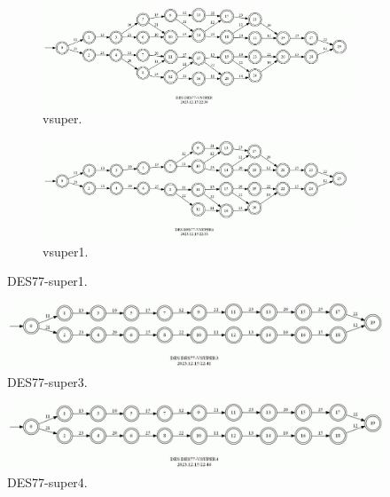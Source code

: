 \documentclass{article}
\begin{document}
\begin{figure}[h!]
  \centering
  \begin{subfigure}{0.8\linewidth}
    \includegraphics[width=\linewidth]{assets/DES77-VSUPER.jpg}
     \caption{vsuper.}
  \end{subfigure}
  \begin{subfigure}{0.8\linewidth}
    \includegraphics[width=\linewidth]{assets/DES77-VSUPER1.jpg}
    \caption{vsuper1.}
  \end{subfigure}
  \caption{DES77-super1.}
  \label{fig:des77-super1}
\end{figure}

\begin{figure}[h!]
  \centering
  \includegraphics[width=0.8\linewidth]{assets/DES77-VSUPER3.jpg}
  \caption{DES77-super3.}
  \label{fig:des77-super3}
\end{figure}

\begin{figure}[h!]
  \centering
  \includegraphics[width=0.8\linewidth]{assets/DES77-VSUPER4.jpg}
  \caption{DES77-super4.}
  \label{fig:des77-super4}
\end{figure}
\end{document}
